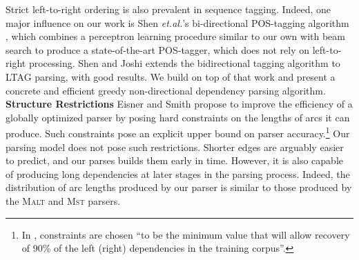 \documentclass[11pt]{article}
\begin{document}
Strict left-to-right ordering is also prevalent in sequence tagging.  Indeed, one major influence on our work is Shen \textit{et.al.}'s bi-directional POS-tagging algorithm \cite{shen-bidi}, which combines a perceptron learning procedure similar to our own with beam search to produce a state-of-the-art POS-tagger, which does not rely on left-to-right processing.  Shen and Joshi  extends the bidirectional tagging algorithm to LTAG parsing, with good results.  We build on top of that work and present a concrete and efficient greedy non-directional dependency parsing algorithm.
\\
\textbf{Structure Restrictions} 
Eisner and Smith  propose to improve the efficiency of a globally optimized parser by posing hard constraints on the lengths of arcs it can produce.  Such constraints pose an explicit upper bound on parser accuracy.\footnote{In \cite{vine-parsing-conll}, constraints are chosen ``to be the minimum value that will allow recovery of 90\% of the left (right) dependencies in the training corpus''.}
Our parsing model does not pose such restrictions.  Shorter edges are arguably easier to predict, and our parses builds them early in time.  However, it is also capable of producing long dependencies at later stages in the parsing process.  Indeed, the distribution of arc lengths produced by our parser is %
similar to those produced by the \textsc{Malt} and \textsc{Mst} parsers.


\end{document}
